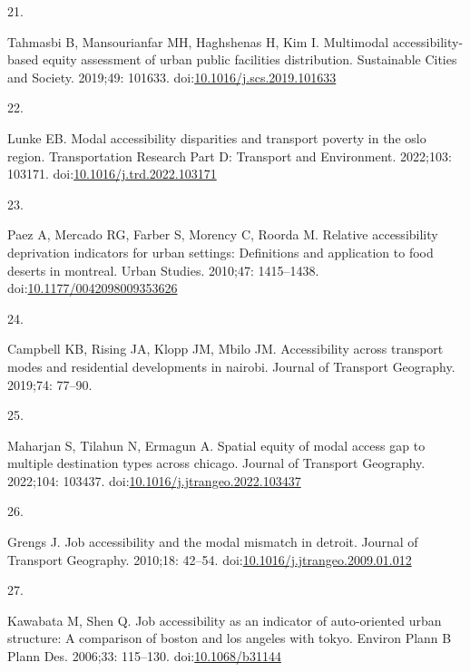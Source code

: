 \documentclass[10pt,letterpaper]{article}
\newlength{\cslhangindent}
\newlength{\csllabelwidth}
\newlength{\cslentryspacingunit} %
\newenvironment{CSLReferences}[2] %
 {%
  \setlength{\parindent}{0pt}
  \ifodd #1
  \let\oldpar\par
  \def\par{\hangindent=\cslhangindent\oldpar}
  \fi
  \setlength{\parskip}{#2\cslentryspacingunit}
 }%
 {}
\newcommand{\CSLLeftMargin}[1]{\parbox[t]{\csllabelwidth}{#1}}
\newcommand{\CSLRightInline}[1]{\parbox[t]{\linewidth - \csllabelwidth}{#1}\break}
\begin{document}
\begin{CSLReferences}{0}{0}
\leavevmode{}%
\CSLLeftMargin{21. }%
\CSLRightInline{Tahmasbi B, Mansourianfar MH, Haghshenas H, Kim I.
Multimodal accessibility-based equity assessment of urban public
facilities distribution. Sustainable Cities and Society. 2019;49:
101633.
doi:\href{https://doi.org/10.1016/j.scs.2019.101633}{10.1016/j.scs.2019.101633}}

\leavevmode{}%
\CSLLeftMargin{22. }%
\CSLRightInline{Lunke EB. Modal accessibility disparities and transport
poverty in the oslo region. Transportation Research Part D: Transport
and Environment. 2022;103: 103171.
doi:\href{https://doi.org/10.1016/j.trd.2022.103171}{10.1016/j.trd.2022.103171}}

\leavevmode{}%
\CSLLeftMargin{23. }%
\CSLRightInline{Paez A, Mercado RG, Farber S, Morency C, Roorda M.
Relative accessibility deprivation indicators for urban settings:
Definitions and application to food deserts in montreal. Urban Studies.
2010;47: 1415--1438.
doi:\href{https://doi.org/10.1177/0042098009353626}{10.1177/0042098009353626}}

\leavevmode{}%
\CSLLeftMargin{24. }%
\CSLRightInline{Campbell KB, Rising JA, Klopp JM, Mbilo JM.
Accessibility across transport modes and residential developments in
nairobi. Journal of Transport Geography. 2019;74: 77--90. }

\leavevmode{}%
\CSLLeftMargin{25. }%
\CSLRightInline{Maharjan S, Tilahun N, Ermagun A. Spatial equity of
modal access gap to multiple destination types across chicago. Journal
of Transport Geography. 2022;104: 103437.
doi:\href{https://doi.org/10.1016/j.jtrangeo.2022.103437}{10.1016/j.jtrangeo.2022.103437}}

\leavevmode{}%
\CSLLeftMargin{26. }%
\CSLRightInline{Grengs J. Job accessibility and the modal mismatch in
detroit. Journal of Transport Geography. 2010;18: 42--54.
doi:\href{https://doi.org/10.1016/j.jtrangeo.2009.01.012}{10.1016/j.jtrangeo.2009.01.012}}

\leavevmode{}%
\CSLLeftMargin{27. }%
\CSLRightInline{Kawabata M, Shen Q. Job accessibility as an indicator of
auto-oriented urban structure: A comparison of boston and los angeles
with tokyo. Environ Plann B Plann Des. 2006;33: 115--130.
doi:\href{https://doi.org/10.1068/b31144}{10.1068/b31144}}


\end{CSLReferences}
\end{document}
